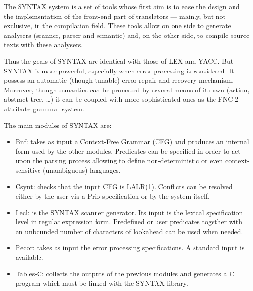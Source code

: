 \documentclass[11pt]{article}
\begin{document}
The SYNTAX system is a set of tools whose first aim is to ease the design and
the implementation of the front-end part of translators --- mainly, but not
exclusive, in the compilation field.  These tools allow on one side to generate
analysers (scanner, parser and semantic) and, on the other side, to compile
source texts with these analysers.

Thus the goals of SYNTAX are identical with those of LEX and YACC.  But SYNTAX
is more powerful, especially when error processing is considered.  It possess
an automatic (though tunable) error repair and recovery mechanism.  Moreover,
though semantics can be processed by several means of its own (action, abstract
tree, \ldots{}) it can be coupled with more sophisticated ones as the FNC-2
attribute grammar system.

The main modules of SYNTAX are:

\begin{itemize}
\item {\sc Bnf}: takes as input a Context-Free Grammar (CFG) and produces an internal
      form used by the other modules.  Predicates can be specified in order to
      act upon the parsing process allowing to define non-deterministic or even
      context-sensitive (unambiguous) languages.

\item {\sc Csynt}: checks that the input CFG is LALR(1).  Conflicts can
      be resolved either by the user via a {\sc Prio} specification or by the
      system itself.

\item {\sc Lecl}: is the SYNTAX scanner generator.  Its input is the lexical
      specification level in regular expression form.  Predefined or user
      predicates together with an unbounded number of characters of lookahead
      can be used when needed.

\item {\sc Recor}: takes as input the error processing specifications.  A
      standard input is available.

\item {\sc Tables-C}: collects the outputs of the previous modules and
      generates a C program which must be linked with the SYNTAX library.

\end{itemize}
\end{document}
